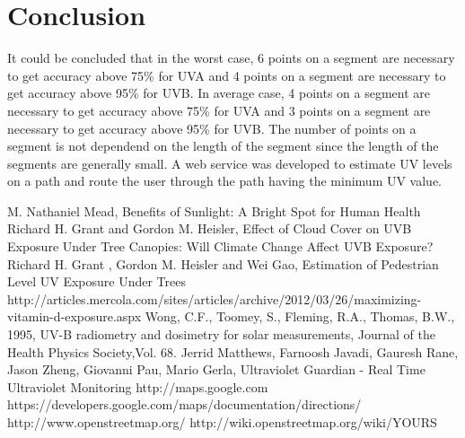\documentclass[10pt]{sigplan-proc-varsize}
\begin{document}
\section{Conclusion}
It could be concluded that in the worst case, 6 points on a segment are necessary to get accuracy above 75\% for UVA and 4 points on a segment are necessary to get accuracy above 95\% for UVB. In average case, 4 points on a segment are necessary to get accuracy above 75\% for UVA and  3 points on a segment are necessary to get accuracy above 95\% for UVB. The number of points on a segment is not dependend on the length of the segment since the length of the segments are generally small. A web service was developed to estimate UV levels on a path and route the user through the path having the minimum UV value.\\
\newpage
\begin{thebibliography}{10}
 M. Nathaniel Mead, Benefits of Sunlight: A Bright Spot for Human Health
 Richard H. Grant and Gordon M. Heisler, Effect of Cloud Cover on UVB Exposure Under Tree Canopies: Will Climate Change Affect UVB Exposure? 
Richard H. Grant , Gordon M. Heisler and Wei Gao, Estimation of Pedestrian Level UV Exposure Under Trees
 http://articles.mercola.com/sites/articles/archive/2012/03/26/maximizing-vitamin-d-exposure.aspx
 Wong, C.F., Toomey, S., Fleming, R.A., Thomas, B.W., 1995, UV-B radiometry and dosimetry for solar measurements, Journal of the Health Physics Society,Vol. 68.
Jerrid Matthews, Farnoosh Javadi, Gauresh Rane, Jason Zheng, Giovanni Pau, Mario Gerla, Ultraviolet Guardian - Real Time Ultraviolet Monitoring
 http://maps.google.com
https://developers.google.com/maps/documentation/directions/
http://www.openstreetmap.org/
http://wiki.openstreetmap.org/wiki/YOURS

\end{thebibliography}
\end{document}
